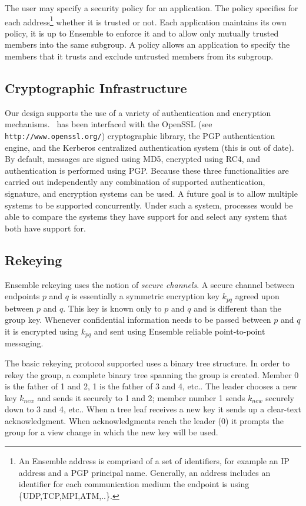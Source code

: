 The user may specify a security policy for an application. The policy
specifies for each address\footnote{An Ensemble address is comprised
of a set of identifiers, for example an IP address and a PGP principal
name. Generally, an address includes an identifier for each
communication medium the endpoint is using \{UDP,TCP,MPI,ATM,..\}.}
whether it is trusted or not. Each application maintains its
own policy, it is up to Ensemble to enforce it and
to allow only mutually trusted members into the same subgroup. A policy
allows an application to specify the members that it trusts and
exclude untrusted members from its subgroup.

\subsection{Cryptographic Infrastructure}
Our design supports the use of a variety of authentication and
encryption mechanisms. \ensemble\ has been interfaced with the OpenSSL
(see {\tt http://www.openssl.org/}) cryptographic library, the PGP authentication engine, and the Kerberos
centralized authentication system (this is out of date). By default,
messages are signed using MD5, encrypted using RC4, and authentication
is performed using PGP. Because these three functionalities are
carried out independently any combination of supported authentication,
signature, and encryption systems can be used.  A future goal is to
allow multiple systems to be supported concurrently.  Under such a
system, processes would be able to compare the systems they have
support for and select any system that both have support for.

\subsection{Rekeying}
Ensemble rekeying uses the notion of {\it secure channels}. A secure
channel between endpoints $p$ and $q$ is essentially a symmetric
encryption key $k_{pq}$ agreed upon between $p$ and $q$. This key is
known only to $p$ and $q$ and is different than the group
key. Whenever confidential information needs to be passed between $p$
and $q$ it is encrypted using $k_{pq}$ and sent using Ensemble
reliable point-to-point messaging. 

The basic rekeying protocol supported uses a binary tree structure.
In order to rekey the group, a complete binary tree spanning the group
is created. Member 0 is the father of 1 and 2, 1 is the father of 3
and 4, etc.. The leader chooses a new key $k_{new}$ and sends it securely to 1
and 2; member number 1 sends $k_{new}$ securely down to 3 and 4, etc.. When a tree
leaf receives a new key it sends up a clear-text acknowledgment. When
acknowledgments reach the leader (0) it prompts the group for a view
change in which the new key will be used. 


